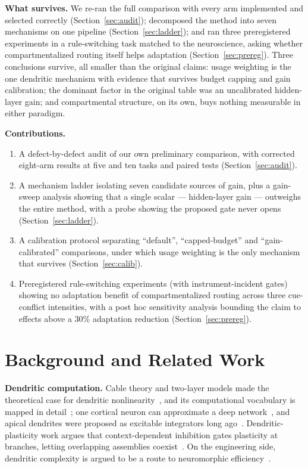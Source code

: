 \documentclass[conference]{IEEEtran}
\begin{document}
\noindent\textbf{What survives.} We re-ran the full comparison with every arm implemented and
selected correctly (Section~\ref{sec:audit}); decomposed the method into seven mechanisms on one
pipeline (Section~\ref{sec:ladder}); and ran three preregistered experiments in a rule-switching
task matched to the neuroscience, asking whether compartmentalized routing itself helps adaptation
(Section~\ref{sec:prereg}). Three conclusions survive, all smaller than the original claims:
usage weighting is the one dendritic mechanism with evidence that survives budget capping and gain
calibration; the dominant factor in the original table was an uncalibrated hidden-layer gain; and
compartmental structure, on its own, buys nothing measurable in either paradigm.

\noindent\textbf{Contributions.}
\begin{enumerate}
\item A defect-by-defect audit of our own preliminary comparison, with corrected eight-arm results at
five and ten tasks and paired tests (Section~\ref{sec:audit}).
\item A mechanism ladder isolating seven candidate sources of gain, plus a gain-sweep analysis
showing that a single scalar --- hidden-layer gain --- outweighs the entire method, with a probe
showing the proposed gate never opens (Section~\ref{sec:ladder}).
\item A calibration protocol separating ``default'', ``capped-budget'' and ``gain-calibrated''
comparisons, under which usage weighting is the only mechanism that survives
(Section~\ref{sec:calib}).
\item Preregistered rule-switching experiments (with instrument-incident gates) showing no
adaptation benefit of compartmentalized routing across three cue-conflict intensities, with a post
hoc sensitivity analysis bounding the claim to effects above a 30\% adaptation reduction
(Section~\ref{sec:prereg}).
\end{enumerate}

\section{Background and Related Work}
\noindent\textbf{Dendritic computation.} Cable theory and two-layer models made the theoretical
case for dendritic nonlinearity~\cite{poirazi2003}, and its computational vocabulary is mapped in
detail~\cite{london2005,poirazi2020}; one cortical neuron can approximate a deep
network~\cite{beniaguev2021}, and apical dendrites were proposed as excitable integrators long
ago~\cite{chang1951,ujfalussy2018}. Dendritic-plasticity work argues that context-dependent
inhibition gates plasticity at branches, letting overlapping assemblies coexist~\cite{onasch2026}.
On the engineering side, dendritic complexity is argued to be a route to neuromorphic
efficiency~\cite{cardwell2025,boyle2025,baek2024,boahen2022}.
\end{document}
